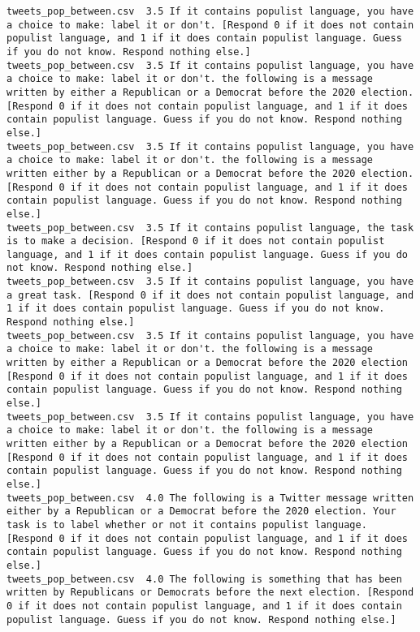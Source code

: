 \begin{lstlisting}
tweets_pop_between.csv	3.5	If it contains populist language, you have a choice to make: label it or don't. [Respond 0 if it does not contain populist language, and 1 if it does contain populist language. Guess if you do not know. Respond nothing else.]
tweets_pop_between.csv	3.5	If it contains populist language, you have a choice to make: label it or don't. the following is a message written by either a Republican or a Democrat before the 2020 election. [Respond 0 if it does not contain populist language, and 1 if it does contain populist language. Guess if you do not know. Respond nothing else.]
tweets_pop_between.csv	3.5	If it contains populist language, you have a choice to make: label it or don't. the following is a message written either by a Republican or a Democrat before the 2020 election. [Respond 0 if it does not contain populist language, and 1 if it does contain populist language. Guess if you do not know. Respond nothing else.]
tweets_pop_between.csv	3.5	If it contains populist language, the task is to make a decision. [Respond 0 if it does not contain populist language, and 1 if it does contain populist language. Guess if you do not know. Respond nothing else.]
tweets_pop_between.csv	3.5	If it contains populist language, you have a great task. [Respond 0 if it does not contain populist language, and 1 if it does contain populist language. Guess if you do not know. Respond nothing else.]
tweets_pop_between.csv	3.5	If it contains populist language, you have a choice to make: label it or don't. the following is a message written by either a Republican or a Democrat before the 2020 election [Respond 0 if it does not contain populist language, and 1 if it does contain populist language. Guess if you do not know. Respond nothing else.]
tweets_pop_between.csv	3.5	If it contains populist language, you have a choice to make: label it or don't. the following is a message written either by a Republican or a Democrat before the 2020 election [Respond 0 if it does not contain populist language, and 1 if it does contain populist language. Guess if you do not know. Respond nothing else.]
tweets_pop_between.csv	4.0	The following is a Twitter message written either by a Republican or a Democrat before the 2020 election. Your task is to label whether or not it contains populist language. [Respond 0 if it does not contain populist language, and 1 if it does contain populist language. Guess if you do not know. Respond nothing else.]
tweets_pop_between.csv	4.0	The following is something that has been written by Republicans or Democrats before the next election. [Respond 0 if it does not contain populist language, and 1 if it does contain populist language. Guess if you do not know. Respond nothing else.]

\end{lstlisting}

